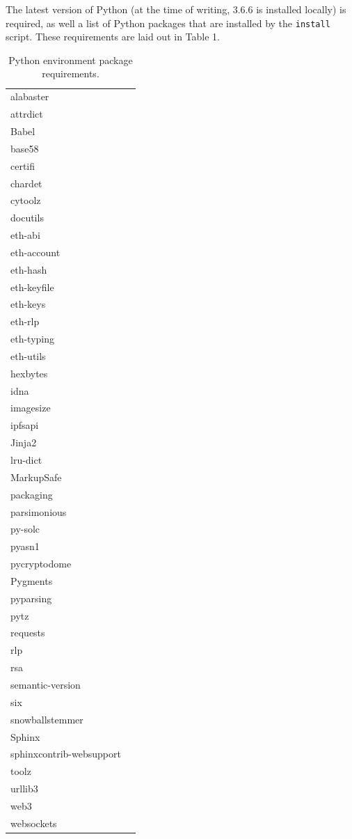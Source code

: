 \documentclass[titlepage]{report}
\begin{document}
The latest version of Python (at the time of writing, 3.6.6 is installed locally) is required, as well a list of Python packages that are installed by the \texttt{install} script. These requirements are laid out in Table 1.

\begin{table}
\begin{center}
\begin{tabular}{| l | p{5cm} |}
alabaster\\
attrdict\\
Babel\\
base58\\
certifi\\
chardet\\
cytoolz\\
docutils\\
eth-abi\\
eth-account\\
eth-hash\\
eth-keyfile\\
eth-keys\\
eth-rlp\\
eth-typing\\
eth-utils\\
hexbytes\\
idna\\
imagesize\\
ipfsapi\\
Jinja2\\
lru-dict\\
MarkupSafe\\
packaging\\
parsimonious\\
py-solc\\
pyasn1\\
pycryptodome\\
Pygments\\
pyparsing\\
pytz\\
requests\\
rlp\\
rsa\\
semantic-version\\
six\\
snowballstemmer\\
Sphinx\\
sphinxcontrib-websupport\\
toolz\\
urllib3\\
web3\\
websockets
\end{tabular}
\caption{Python environment package requirements.}
\end{center}
\end{table}
\end{document}
